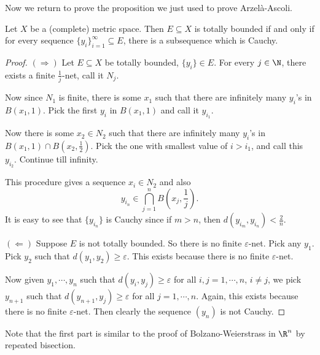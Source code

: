 \documentclass[a4paper]{article}
\begin{document}
Now we return to prove the proposition we just used to prove Arzel\`a-Ascoli.
\begin{prop}
  Let $X$ be a (complete) metric space. Then $E\subseteq X$ is totally bounded if and only if for every sequence $\{y_i\}_{i = 1}^\infty \subseteq E$, there is a subsequence which is Cauchy.
\end{prop}

\begin{proof}
  $(\Rightarrow)$ Let $E \subseteq X$ be totally bounded, $\{y_i\} \in E$. For every $j \in \N$, there exists a finite $\frac{1}{j}$-net, call it $N_j$.

  Now since $N_1$ is finite, there is some $x_1$ such that there are infinitely many $y_i$'s in $B(x_1, 1)$. Pick the first $y_i$ in $B(x_1, 1)$ and call it $y_{i_1}$.

  Now there is some $x_2 \in N_2$ such that there are infinitely many $y_i$'s in $B(x_1, 1) \cap B(x_2, \frac{1}{2})$. Pick the one with smallest value of $i > i_1$, and call this $y_{i_2}$. Continue till infinity.

  This procedure gives a sequence $x_i \in N_2$ and also
  \[
    y_{i_n} \in \bigcap_{j = 1}^n B\left(x_j, \frac{1}{j}\right).
  \]
  It is easy to see that $\{y_{i_n}\}$ is Cauchy since if $m > n$, then $d(y_{i_m}, y_{i_n}) < \frac{2}{n}$.

  $(\Leftarrow)$ Suppose $E$ is not totally bounded. So there is no finite $\varepsilon$-net. Pick any $y_1$. Pick $y_2$ such that $d(y_1, y_2) \geq \varepsilon$. This exists because there is no finite $\varepsilon$-net.

  Now given $y_1, \cdots, y_n$ such that $d(y_i, y_j) \geq \varepsilon$ for all $i, j = 1, \cdots, n$, $i \not= j$, we pick $y_{n + 1}$ such that $d(y_{n + 1}, y_j) \geq \varepsilon$ for all $j = 1, \cdots, n$. Again, this exists because there is no finite $\varepsilon$-net. Then clearly the sequence $(y_n)$ is not Cauchy.
\end{proof}
Note that the first part is similar to the proof of Bolzano-Weierstrass in $\R^n$ by repeated bisection.
\end{document}
